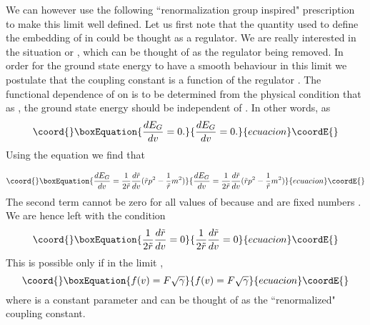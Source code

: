 \documentclass[a4paper,12pt]{article}
\begin{document}
We can however use the following ``renormalization group inspired"
prescription to make this limit well defined. Let us first note that
 the quantity \coordHE{} used to define the embedding of \coordHE{} in \coordHE{} 
 could be thought as a regulator.
We are really interested in the situation \coordHE{} or
\coordHE{}, which can be thought of as the regulator being removed.   
In order for the ground state energy to have a
smooth behaviour in this limit we postulate that               
 the coupling constant \coordHE{} is  a function of the regulator \coordHE{}.
The functional dependence of \coordHE{} on \coordHE{} is to be determined from the
physical condition that as \coordHE{},
the ground state energy should
be independent of \coordHE{}. In other words, as 
\coordHE{}
\begin{equation}\coord{}\boxEquation{
\frac{dE_G}{dv}=0.
}{
\frac{dE_G}{dv}=0.
}{ecuacion}\coordE{}\end{equation}
Using the equation \coordHE{} we find that

\begin{equation}\coord{}\boxEquation{
\frac{dE_G}{dv}=\frac{1}{2{\tilde r}}\frac{d {\tilde r}}{dv}({\tilde r}p^2 
- \frac{1}{{\tilde r}}m^2)
}{
\frac{dE_G}{dv}=\frac{1}{2{\tilde r}}\frac{d {\tilde r}}{dv}({\tilde r}p^2 
- \frac{1}{{\tilde r}}m^2)
}{ecuacion}\coordE{}\end{equation}
The second term cannot be zero for all values of
\coordHE{} because \coordHE{} and \coordHE{} are fixed numbers . We are hence left with
the condition
\begin{equation}\coord{}\boxEquation{
\frac{1}{2{\tilde r}}\frac{d {\tilde r}}{dv}=0
}{
\frac{1}{2{\tilde r}}\frac{d {\tilde r}}{dv}=0
}{ecuacion}\coordE{}\end{equation}
This is possible only if in the limit \coordHE{}, 
\begin{equation}\coord{}\boxEquation{
f(v)=F\sqrt{\gamma}
}{
f(v)=F\sqrt{\gamma}
}{ecuacion}\coordE{}\end{equation}
where \coordHE{} is a constant parameter and can be thought of as the
``renormalized" coupling constant.
\end{document}

